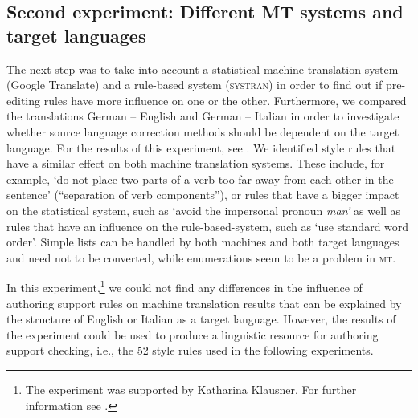 \documentclass[output=paper]{LSP/langsci}
\begin{document}
\subsection{Second experiment: Different MT systems and target languages}\label{sec:siegel:6.2}

The next step was to take into account a statistical machine translation system (Google Translate) and a rule-based system (\textsc{systran}) in order to find out if pre-editing rules have more influence on one or the other. Furthermore, we compared the translations German -- English and German -- Italian in order to investigate whether source language correction methods should be dependent on the target language. For the results of this experiment, see . We identified style rules that have a similar effect on both machine translation systems. These include, for example, `do not place two parts of a verb too far away from each other in the sentence' (``separation of verb components''), or rules that have a bigger impact on the statistical system, such as `avoid the impersonal pronoun \textit{man'} as well as rules that have an influence on the rule-based-system, such as `use standard word order'. Simple lists can be handled by both machines and both target languages and need not to be converted, while enumerations seem to be a problem in \textsc{mt}.

In this experiment,\footnote{The experiment was supported by Katharina Klausner. For further information see \citet{Klausner2011}.} we could not find any differences in the influence of authoring support rules on machine translation results that can be explained by the structure of English or Italian as a target language. However, the results of the experiment could be used to produce a linguistic resource for authoring support checking, i.e., the 52 style rules 
{used in} the following experiments. 
\end{document}

